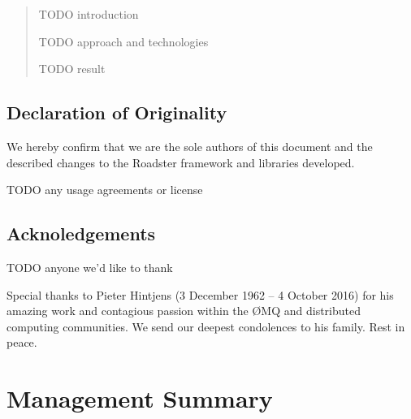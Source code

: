 \documentclass[a4paper]{report}
\newcommand\zmq{{\O}MQ\xspace}
\begin{document}
\begin{abstract}

TODO introduction

TODO approach and technologies

TODO result

\end{abstract}

\chapter*{Declaration of Originality}
We hereby confirm that we are the sole authors of this document and the
described changes to the Roadster framework and libraries developed.

TODO any usage agreements or license
%

\chapter*{Acknoledgements}
TODO anyone we'd like to thank

Special thanks to Pieter Hintjens {\textdagger} (3 December 1962 -- 4 October
2016) for his amazing work and contagious passion within the \zmq and
distributed computing communities. We send our deepest condolences to his
family. Rest in peace.

\tableofcontents
\listoffigures
\listoftables
\lstlistoflistings

\pagebreak
{}
\setcounter{page}{1}

\part{Management Summary}\label{part:mgmtsummary}


\end{document}
